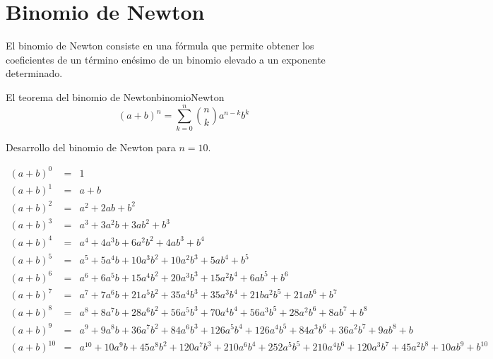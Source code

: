 
\section{Binomio de Newton}

El binomio de Newton consiste en una fórmula que permite obtener los
coeficientes de un término enésimo de un binomio elevado a un exponente
determinado.


\begin{theorem}{El teorema del binomio de Newton}{binomioNewton}
	\begin{equation}
		(a+b)^n = \sum_{k=0}^{n} \binom{n}{k} a^{n-k} b^k
	\end{equation}
\end{theorem}

Desarrollo del binomio de Newton para $n=10$.

\begin{landscape}
	\begin{equation}
		\begin{array}{llc} 
			(a+b)^0 	& = & 1 \\
			(a+b)^1 	& = & a+b \\
			(a+b)^2 	& = & a^2+2ab+b^2 \\
			(a+b)^3 	& = & a^3+3a^2b+3ab^2+b^3 \\
			(a+b)^4 	& = & a^4+4a^3b+6a^2b^2+4ab^3+b^4 \\
			(a+b)^5 	& = & a^5+5a^4b+10a^3b^2+10a^2b^3+5ab^4+b^5\\
			(a+b)^6 	& = & a^6+6a^5b+15a^4b^2+20a^3b^3+15a^2b^4+6ab^5+b^6\\
			(a+b)^7 	& = & a^7+7a^6b+21a^5b^2+35a^4b^3+35a^3b^4+21ba^2b^5+21ab^6+b^7 \\
			(a+b)^8 	& = & a^8+8a^7b+28a^6b^2+56a^5b^3+70a^4b^4+56a^3b^5+28a^2b^6+8ab^7+b^8 \\
			(a+b)^9 	& = & a^9+9a^8b+36a^7b^2+84a^6b^3+126a^5b^4+126a^4b^5+84a^3b^6+36a^2b^7+9ab^8+b \\
			(a+b)^{10} 	& = & a^{10}+10a^9b+45a^8b^2+120a^7b^3+210a^6b^4+252a^5b^5+210a^4b^6+120a^3b^7+45a^2b^8+10ab^9+b^{10} \\
		\end{array}
	\end{equation}
\end{landscape}

